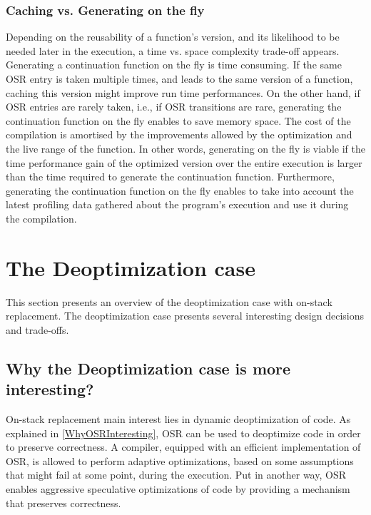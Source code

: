 \subsubsection{Caching vs. Generating on the fly}

Depending on the reusability of a function's version, and its likelihood to be needed later in the execution, a time vs. space complexity trade-off appears.
Generating a continuation function on the fly is time consuming.
If the same OSR entry is taken multiple times, and leads to the same version of a function, caching this version might improve run time performances.
On the other hand, if OSR entries are rarely taken, i.e., if OSR transitions are rare, generating the continuation function on the fly enables to save memory space. 
The cost of the compilation is amortised by the improvements allowed by the optimization and the live range of the function. 
In other words, generating on the fly is viable if the time performance gain of the optimized version over the entire execution is larger than the time required to generate the continuation function.
Furthermore, generating the continuation function on the fly enables to take into account the latest profiling data gathered about the program's execution and use it during the compilation.\\


\section{The Deoptimization case}
This section presents an overview of the deoptimization case with on-stack replacement.
The deoptimization case presents several interesting design decisions and trade-offs.

\subsection{Why the Deoptimization case is more interesting?}\label{WhyDeopt}
On-stack replacement main interest lies in dynamic deoptimization of code.
As explained in \ref{WhyOSRInteresting}, OSR can be used to deoptimize code in order to preserve correctness.
A compiler, equipped with an efficient implementation of OSR, is allowed to perform adaptive optimizations, based on some assumptions that might fail at some point, during the execution.
Put in another way, OSR enables aggressive speculative optimizations of code by providing a mechanism that preserves correctness.\\

